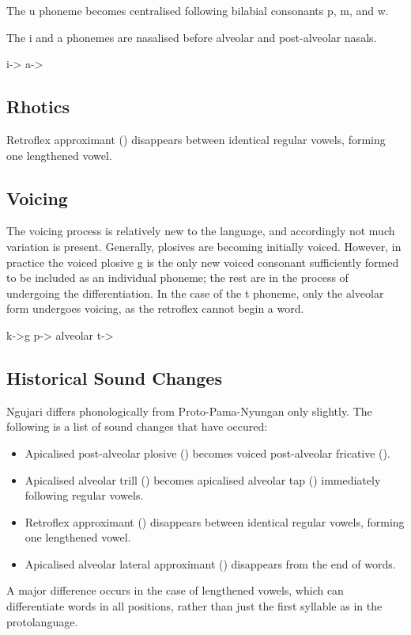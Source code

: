 The u phoneme becomes centralised following bilabial consonants p, m, and w.

The i and a phonemes are nasalised before alveolar and post-alveolar nasals.

i->
a->

\subsection{Rhotics}

\phonl{\textipa{\|]r}}{\textipa{\|]R}}{ShortV}

Retroflex approximant (\textipa{\textturnrrtail}) disappears between identical
regular vowels, forming one lengthened vowel.

\subsection{Voicing}

The voicing process is relatively new to the language, and accordingly not much
variation is present. Generally, plosives are becoming initially voiced.
However, in practice the voiced plosive g is the only new voiced consonant
sufficiently formed to be included as an individual phoneme; the rest are in the
process of undergoing the differentiation. In the case of the t phoneme, only
the alveolar form undergoes voicing, as the retroflex cannot begin a word.

k->g
p->
alveolar t->

\subsection{Historical Sound Changes}

Ngujari differs phonologically from Proto-Pama-Nyungan only slightly. The
following is a list of sound changes that have occured:

\begin{itemize}
\item Apicalised post-alveolar plosive () becomes
  voiced post-alveolar fricative ().
\item Apicalised alveolar trill (\textipa{\|]r}) becomes apicalised alveolar tap
  (\textipa{\|]R}) immediately following regular vowels.
\item Retroflex approximant (\textipa{\textturnrrtail}) disappears between
  identical regular vowels, forming one lengthened vowel.
\item Apicalised alveolar lateral approximant (\textipa{\|]l}) disappears from
  the end of words.
\end{itemize}

A major difference occurs in the case of lengthened vowels, which can
differentiate words in all positions, rather than just the first syllable as in
the protolanguage.
